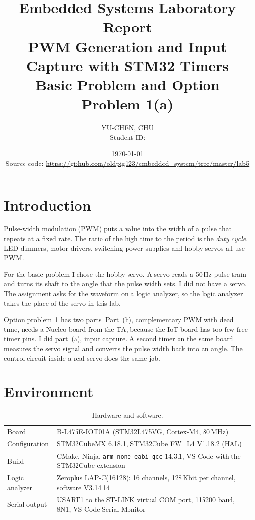\documentclass[11pt,a4paper]{article}
\title{Embedded Systems Laboratory Report\\
       \large PWM Generation and Input Capture with STM32 Timers\\
       \normalsize Basic Problem and Option Problem 1(a)}
\author{YU-CHEN, CHU\\
        \normalsize Student ID: \studentid}
\date{\today\\[2ex]
      \normalsize Source code:
      \url{https://github.com/oldpig123/embedded_system/tree/master/lab5}}
\begin{document}
\maketitle
\tableofcontents
\newpage

\section{Introduction}

Pulse-width modulation (PWM) puts a value into the width of a pulse that
repeats at a fixed rate. The ratio of the high time to the period is the
\emph{duty cycle}. LED dimmers, motor drivers, switching power supplies and
hobby servos all use PWM.

For the basic problem I chose the hobby servo. A servo reads a 50\,Hz pulse
train and turns its shaft to the angle that the pulse width sets. I did not
have a servo. The assignment asks for the waveform on a logic analyzer, so the
logic analyzer takes the place of the servo in this lab.

Option problem~1 has two parts. Part~(b), complementary PWM with dead time,
needs a Nucleo board from the TA, because the IoT board has too few free timer
pins. I did part~(a), input capture. A second timer on the same board measures
the servo signal and converts the pulse width back into an angle. The control
circuit inside a real servo does the same job.

\section{Environment}

\begin{table}[h]
\centering
\caption{Hardware and software.}
\begin{tabular}{@{}lp{11.5cm}@{}}
\toprule
Board            & B-L475E-IOT01A (STM32L475VG, Cortex-M4, 80\,MHz) \\
Configuration    & STM32CubeMX 6.18.1, STM32Cube FW\_L4 V1.18.2 (HAL) \\
Build            & CMake, Ninja, \texttt{arm-none-eabi-gcc} 14.3.1, VS Code with the STM32Cube extension \\
Logic analyzer   & Zeroplus LAP-C(16128): 16 channels, 128\,Kbit per channel, software V3.14.14 \\
Serial output    & USART1 to the ST-LINK virtual COM port, 115200 baud, 8N1, VS Code Serial Monitor \\
\bottomrule
\end{tabular}
\end{table}
\end{document}
